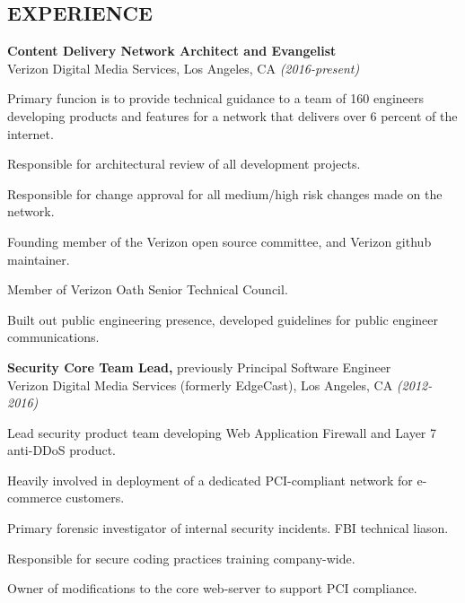 \documentclass[margin]{res}
\begin{document}
\begin{resume}
\section{EXPERIENCE}
\noindent

{\bf Content Delivery Network Architect and Evangelist}\\ 
Verizon Digital Media Services, Los Angeles, CA {\em (2016-present)}
\begin{list}{}{\leftmargin=1.5em \topsep=5pt \partopsep=0pt \parsep=2.5pt}
  \item Primary funcion is to provide technical guidance to a team of 160 engineers developing products and features for a network that delivers over 6 percent of the internet. 
  \item Responsible for architectural review of all development projects.
  \item Responsible for change approval for all medium/high risk changes made on the network.
  \item Founding member of the Verizon open source committee, and Verizon github maintainer.
  \item Member of Verizon Oath Senior Technical Council.
  \item Built out public engineering presence, developed guidelines for public engineer communications.
\end{list}

{\bf Security Core Team Lead,} previously Principal Software Engineer\\ 
Verizon Digital Media Services (formerly EdgeCast), Los Angeles, CA {\em (2012-2016)}
\begin{list}{}{\leftmargin=1.5em \topsep=5pt \partopsep=0pt \parsep=2.5pt}
  \item Lead security product team developing Web Application Firewall
    and Layer 7 anti-DDoS product.
  \item Heavily involved in deployment of a dedicated PCI-compliant network for 
    e-commerce customers.
  \item Primary forensic investigator of internal security incidents.  
    FBI technical liason.
  \item Responsible for secure coding practices training company-wide.
  \item Owner of modifications to the core web-server to support PCI 
    compliance.
\end{list}


\end{resume}
\end{document}
